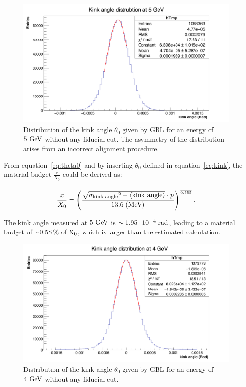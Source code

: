    \begin{figure}[!tbh]
     \centering
     \includegraphics[width = \textwidth]{Pictures/X0/kinkAngle5GeV_2.png}
     \caption{Distribution of the kink angle $\theta_{0}$ given by GBL for an energy of $5~\rm{GeV}$ without any fiducial cut. The asymmetry of the distribution arises from an incorrect alignment procedure.}
     \label{fig:kinkAngle5GeV}
   \end{figure} 

   From equation~\ref{eq:theta0} and by inserting $\theta_0$ defined in equation~\ref{eq:kink}, the material budget $\frac{x}{X_0}$ could be derived as:
   
   \begin{equation}
     \frac{x}{X_{0}} = \left( \frac{\sqrt{\rm{\sigma_{kink~angle}}^2 - \langle\rm{kink~angle}\rangle} \cdot p}{13.6~\rm{(MeV)}} \right)^{\frac{1}{0.555}}.
   \end{equation}

   The kink angle measured at $5~\rm{GeV}$ is $\sim 1.95 \cdot 10^{-4}~\rm{rad}$, leading to a material budget of $\sim 0.58~\%$ of $\rm{X_0}$, which is larger than the estimated calculation.
   
   \begin{figure}[!p]
     \centering
     \includegraphics[width = \textwidth]{Pictures/X0/kinkAngle4GeV.png}
     \caption{Distribution of the kink angle $\theta_{0}$ given by GBL for an energy of $4~\rm{GeV}$ without any fiducial cut.}
     \label{fig:kinkAngle4GeV}
   \end{figure} 

